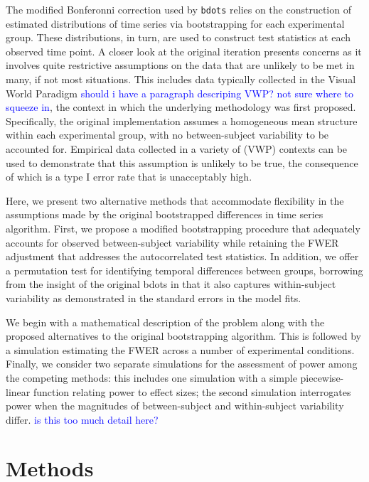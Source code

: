 \documentclass{article}
\newcommand{\xt}{\texttt}
\providecommand{\cn}[1]{\textcolor{blue}{#1}}
\begin{document}
The modified Bonferonni correction used by \xt{bdots} relies on the construction of estimated distributions of time series via bootstrapping for each experimental group. These distributions, in turn, are used to construct test statistics at each observed time point. A closer look at the original iteration presents concerns as it involves quite restrictive assumptions on the data that are unlikely to be met in many, if not most situations. This includes data typically collected in the Visual World Paradigm \cn{should i have a paragraph descriping VWP? not sure where to squeeze in}, the context in which the underlying methodology was first proposed. Specifically, the original implementation assumes a homogeneous mean structure within each experimental group, with no between-subject variability to be accounted for. Empirical data collected in a variety of (VWP) contexts can be used to demonstrate that this assumption is unlikely to be true, the consequence of which is a type I error rate that is unacceptably high.

Here, we present two alternative methods that accommodate flexibility in the assumptions made by the original bootstrapped differences in time series algorithm. First, we propose a modified bootstrapping procedure that adequately accounts for observed between-subject variability while retaining the FWER adjustment that addresses the autocorrelated test statistics. In addition, we offer a permutation test for identifying temporal differences between groups, borrowing from the insight of the original bdots in that it also captures within-subject variability as demonstrated in the standard errors in the model fits.

We begin with a mathematical description of the problem along with the proposed alternatives to the original bootstrapping algorithm. This is followed by a simulation estimating the FWER across a number of experimental conditions. Finally, we consider two separate simulations for the assessment of power among the competing methods: this includes one simulation with a simple piecewise-linear function relating power to effect sizes; the second simulation interrogates power when the magnitudes of between-subject and within-subject variability differ. \cn{is this too much detail here?}




\section{Methods}
\end{document}
